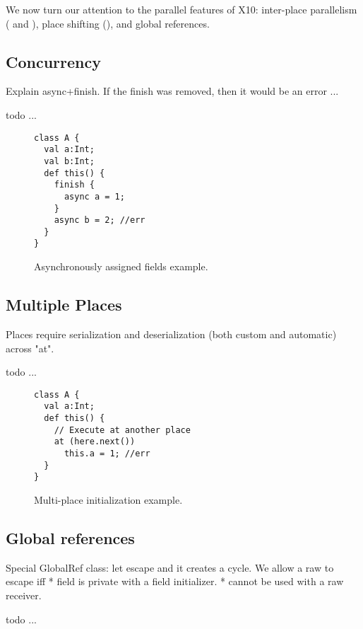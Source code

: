 We now turn our attention to the parallel features of X10:
    inter-place parallelism ( and ),
    place shifting (),
    and global references.


\subsection{Concurrency}
Explain async+finish.
If the finish was removed, then it would be an error ...


 todo ...

\begin{figure}
\begin{lstlisting}
class A {
  val a:Int;
  val b:Int;
  def this() {
    finish {
      async a = 1;
    }
    async b = 2; //err
  }
}
\end{lstlisting}
\caption{Asynchronously assigned fields example.
    }
\label{Figure:Asynchronously-init}
\end{figure}


\subsection{Multiple Places}
Places require serialization and deserialization (both custom and automatic) across "at".

 todo ...

\begin{figure}
\begin{lstlisting}
class A {
  val a:Int;
  def this() {
    // Execute at another place
    at (here.next())
      this.a = 1; //err
  }
}
\end{lstlisting}
\caption{Multi-place initialization example.
    }
\label{Figure:Multi-place}
\end{figure}


\subsection{Global references}
Special GlobalRef class: let \this escape and it creates a cycle.
We allow a raw \this to escape iff
* field is private with a field initializer.
* cannot be used with a raw \this receiver.


 todo ...

